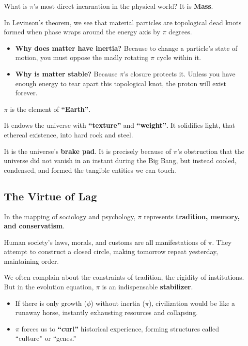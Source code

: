 What is $\pi$'s most direct incarnation in the physical world? It is \textbf{Mass}.

In Levinson's theorem, we see that material particles are topological dead knots formed when phase wraps around the energy axis by $\pi$ degrees.

\begin{itemize}
\item \textbf{Why does matter have inertia?} Because to change a particle's state of motion, you must oppose the madly rotating $\pi$ cycle within it.

\item \textbf{Why is matter stable?} Because $\pi$'s closure protects it. Unless you have enough energy to tear apart this topological knot, the proton will exist forever.
\end{itemize}

$\pi$ is the element of \textbf{``Earth''}.

It endows the universe with \textbf{``texture''} and \textbf{``weight''}. It solidifies light, that ethereal existence, into hard rock and steel.

It is the universe's \textbf{brake pad}. It is precisely because of $\pi$'s obstruction that the universe did not vanish in an instant during the Big Bang, but instead cooled, condensed, and formed the tangible entities we can touch.

\subsection{The Virtue of Lag}

In the mapping of sociology and psychology, $\pi$ represents \textbf{tradition, memory, and conservatism}.

Human society's laws, morals, and customs are all manifestations of $\pi$. They attempt to construct a closed circle, making tomorrow repeat yesterday, maintaining order.

We often complain about the constraints of tradition, the rigidity of institutions. But in the evolution equation, $\pi$ is an indispensable \textbf{stabilizer}.

\begin{itemize}
\item If there is only growth ($\phi$) without inertia ($\pi$), civilization would be like a runaway horse, instantly exhausting resources and collapsing.

\item $\pi$ forces us to \textbf{``curl''} historical experience, forming structures called ``culture'' or ``genes.''
\end{itemize}

